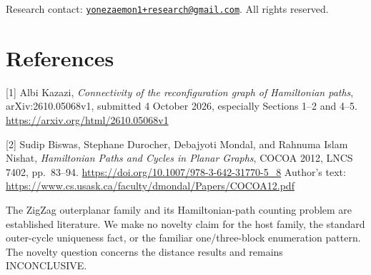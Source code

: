 \documentclass[11pt,a4paper]{article}
\begin{document}
Research contact: \href{mailto:yonezaemon1+research@gmail.com}{\nolinkurl{yonezaemon1+research@gmail.com}}. All rights reserved.

\hypertarget{references}{%
\section{References}\label{references}}
\raggedright

{[}1{]} Albi Kazazi, \emph{Connectivity of the reconfiguration graph of Hamiltonian paths}, arXiv:2610.05068v1, submitted 4 October 2026, especially Sections 1--2 and 4--5. \url{https://arxiv.org/html/2610.05068v1}

{[}2{]} Sudip Biswas, Stephane Durocher, Debajyoti Mondal, and Rahnuma Islam Nishat, \emph{Hamiltonian Paths and Cycles in Planar Graphs}, COCOA 2012, LNCS 7402, pp.~83--94. \url{https://doi.org/10.1007/978-3-642-31770-5_8} Author's text: \url{https://www.cs.usask.ca/faculty/dmondal/Papers/COCOA12.pdf}

The ZigZag outerplanar family and its Hamiltonian-path counting problem are established literature. We make no novelty claim for the host family, the standard outer-cycle uniqueness fact, or the familiar one/three-block enumeration pattern. The novelty question concerns the distance results and remains INCONCLUSIVE.
\end{document}
